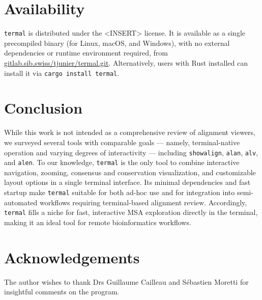 \documentclass[11pt]{article}
\begin{document}
\section*{Availability}

\texttt{termal} is distributed under the <INSERT> license. It is available as a
single precompiled binary (for Linux, macOS, and Windows), with no external
dependencies or runtime environment required, from
\url{gitlab.sib.swiss/tjunier/termal.git}. Alternatively, users with Rust
installed can install it via \texttt{cargo install termal}.

\section*{Conclusion}

While this work is not intended as a comprehensive review of alignment viewers,
we surveyed several tools with comparable goals — namely, terminal-native
operation and varying degrees of interactivity — including \texttt{showalign},
\texttt{alan}, \texttt{alv}, and \texttt{alen}.  To our knowledge,
\texttt{termal} is the only tool to combine interactive navigation, zooming,
consensus and conservation visualization, and customizable layout options in a
single terminal interface.  Its minimal dependencies and fast startup make
\texttt{termal} suitable for both ad-hoc use and for integration into
semi-automated workflows requiring terminal-based alignment review. Accordingly,
\texttt{termal} fills a niche for fast, interactive MSA exploration directly in
the terminal, making it an ideal tool for remote bioinformatics workflows.

\section*{Acknowledgements}

The author wishes to thank Drs Guillaume Cailleau and Sébastien Moretti for
insightful comments on the program.


\end{document}
